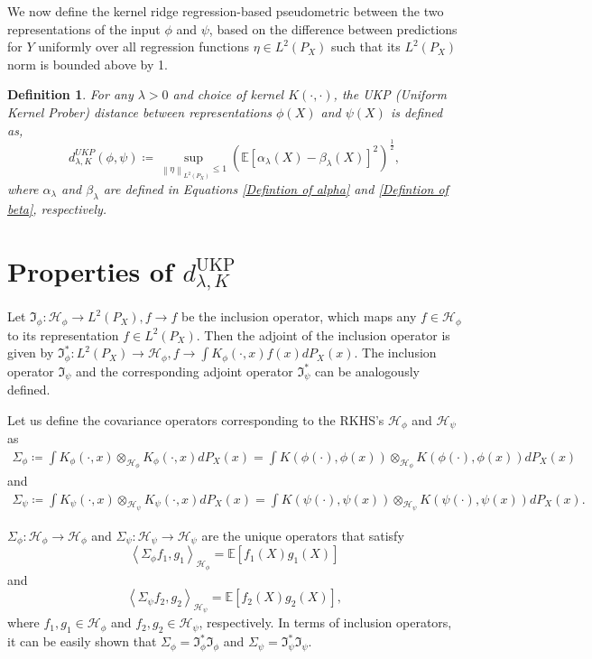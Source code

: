 \documentclass[11pt]{article}
\newcommand{\E}{\mathbb{E}}
\newcommand{\I}{\mathfrak{I}}
\newcommand{\Hil}{\mathcal{H}}
\newcommand{\repone}{\phi}
\newcommand{\reptwo}{\psi}
\newcommand{\Hone}{\mathcal{H}_{\phi}}
\newcommand{\Htwo}{\mathcal{H}_{\psi}}
\newcommand{\norm}[1]{\left\|#1\right\|}
\newcommand{\inprod}[1]{\left \langle #1 \right\rangle}
\newcommand{\LPtwo}{L^{2}(P_{X})}
\newcommand{\metricstname}{UKP }
\newcommand{\metricfullname}{Uniform Kernel Prober}
\theoremstyle{plain}
\newcounter{definitionno}
\newtheorem{definition}[definitionno]{Definition}
\begin{document}
We now define the kernel ridge regression-based pseudometric between the two representations of the input $\repone$ and $\reptwo$, based on the difference between predictions for $Y$ uniformly over all regression functions $\eta \in \LPtwo$ such that its $\LPtwo$ norm is bounded above by 1.
\begin{definition}\label{Definition of pseudometric}
    For any $\lambda>0$ and choice of kernel $K(\cdot,\cdot)$, the \metricstname (\metricfullname) distance between representations $\repone(X)$ and $\reptwo(X)$ is defined as, 
    \[
    d_{\lambda,K}^{\metricstname}(\repone,\reptwo) \coloneq \underset{\norm{\eta}_{\LPtwo} \leq 1}{\sup} \left(\E\left[\alpha_{\lambda}(X)-\beta_{\lambda}(X)\right]^{2}\right)^{\frac{1}{2}},
    \]
    where $\alpha_{\lambda}$ and $\beta_{\lambda}$ are defined in Equations \eqref{Defintion of alpha} and \eqref{Defintion of beta}, respectively.
\end{definition}

\section{Properties of $d_{\lambda,K}^{\text{\metricstname}}$} \label{Properties}

Let $\I_{\repone}: \Hone \to \LPtwo, f \to f$ be the inclusion operator, which maps any $f \in \Hone$ to its representation $f \in \LPtwo$. Then the adjoint of the inclusion operator is given by $\I_{\repone}^{*}:\LPtwo \to \Hone, f \to \int K_{\repone}(\cdot,x)f(x)dP_{X}(x)$. The inclusion operator $\I_{\reptwo}$ and the corresponding adjoint operator $\I_{\reptwo}^{*}$ can be analogously defined. 

Let us define the covariance operators corresponding to the RKHS's $\Hone$ and $\Htwo$ as
\[
\begin{aligned}
    \Sigma_{\repone} \coloneq \int K_{\repone}(\cdot,x) \otimes_{\Hone}  K_{\repone}(\cdot,x) dP_{X}(x)= \int K(\repone(\cdot),\repone(x)) \otimes_{\Hone} K(\repone(\cdot),\repone(x)) dP_{X}(x)
\end{aligned}
\]
and 
\[
\begin{aligned}
    \Sigma_{\reptwo} \coloneq \int K_{\reptwo}(\cdot,x) \otimes_{\Htwo}  K_{\reptwo}(\cdot,x) dP_{X}(x)= \int K(\reptwo(\cdot),\reptwo(x)) \otimes_{\Htwo} K(\reptwo(\cdot),\reptwo(x)) dP_{X}(x).
\end{aligned}
\]

$\Sigma_{\repone}: \Hil_{\repone} \to \Hil_{\repone}$ and $\Sigma_{\reptwo}: \Hil_{\reptwo} \to \Hil_{\reptwo}$ are the unique operators that satisfy 
\[
    \inprod{\Sigma_{\repone}f_{1},g_{1}}_{\Hone} = \E\left[f_{1}(X)g_{1}(X)\right]
\]
and
\[
    \inprod{\Sigma_{\reptwo}f_{2},g_{2}}_{\Htwo} = \E\left[f_{2}(X)g_{2}(X)\right],
\]
where $f_{1},g_{1} \in \Hone$ and $f_{2},g_{2} \in \Htwo$, respectively. In terms of inclusion operators, it can be easily shown that $\Sigma_{\repone} = \I_{\repone}^{*}\I_{\repone}$ and $\Sigma_{\reptwo} = \I_{\reptwo}^{*}\I_{\reptwo}$.
\end{document}
